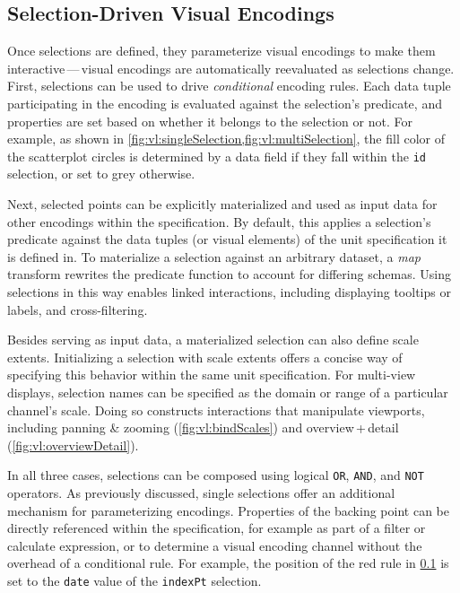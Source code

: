 \subsection{Selection-Driven Visual Encodings}

Once selections are defined, they parameterize visual encodings to make them
interactive\,---\,visual encodings are automatically reevaluated as selections
change. First, selections can be used to drive \emph{conditional} encoding
rules. Each data tuple participating in the encoding is evaluated against the
selection's predicate, and properties are set based on whether it belongs to the
selection or not. For example, as shown in
\cref{fig:vl:singleSelection,fig:vl:multiSelection}, the fill color of the scatterplot
circles is determined by a data field if they fall within the \texttt{id}
selection, or set to grey otherwise.

Next, selected points can be explicitly materialized and used as input data for
other encodings within the specification. By default, this applies a selection's
predicate against the data tuples (or visual elements) of the unit specification
it is defined in. To materialize a selection against an arbitrary dataset, a
\emph{map} transform rewrites the predicate function to account for differing
schemas. Using selections in this way enables linked interactions, including
displaying tooltips or labels, and cross-filtering.

Besides serving as input data, a materialized selection can also define scale
extents. Initializing a selection with scale extents offers a concise way of
specifying this behavior within the same unit specification. For multi-view
displays, selection names can be specified as the domain or range of a
particular channel's scale. Doing so constructs interactions that manipulate
viewports, including panning \& zooming (\cref{fig:vl:bindScales}) and
overview\,+\,detail (\cref{fig:vl:overviewDetail}).

In all three cases, selections can be composed using logical \texttt{OR},
\texttt{AND}, and \texttt{NOT} operators. As previously discussed, single
selections offer an additional mechanism for parameterizing encodings.
Properties of the backing point can be directly referenced within  the
specification, for example as part of a filter or calculate expression, or to
determine a visual encoding channel without the overhead of a conditional rule.
For example, the position of the red rule in \cref{} is set to
the \texttt{date} value of the \texttt{indexPt} selection.

